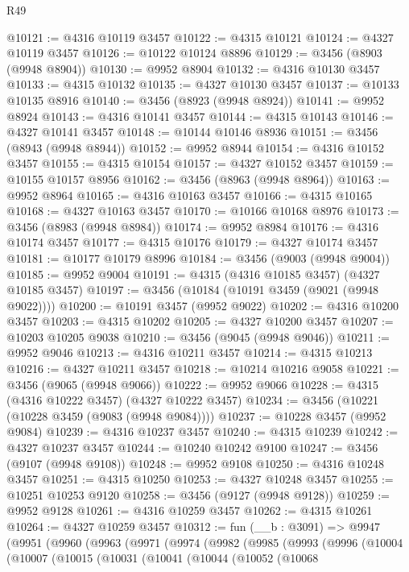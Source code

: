 \begin{lexlean}{R49}
\begin{coremodule}
@10121 := @4316 @10119 @3457
@10122 := @4315 @10121
@10124 := @4327 @10119 @3457
@10126 := @10122 @10124 @8896
@10129 := @3456 (@8903 (@9948 @8904))
@10130 := @9952 @8904
@10132 := @4316 @10130 @3457
@10133 := @4315 @10132
@10135 := @4327 @10130 @3457
@10137 := @10133 @10135 @8916
@10140 := @3456 (@8923 (@9948 @8924))
@10141 := @9952 @8924
@10143 := @4316 @10141 @3457
@10144 := @4315 @10143
@10146 := @4327 @10141 @3457
@10148 := @10144 @10146 @8936
@10151 := @3456 (@8943 (@9948 @8944))
@10152 := @9952 @8944
@10154 := @4316 @10152 @3457
@10155 := @4315 @10154
@10157 := @4327 @10152 @3457
@10159 := @10155 @10157 @8956
@10162 := @3456 (@8963 (@9948 @8964))
@10163 := @9952 @8964
@10165 := @4316 @10163 @3457
@10166 := @4315 @10165
@10168 := @4327 @10163 @3457
@10170 := @10166 @10168 @8976
@10173 := @3456 (@8983 (@9948 @8984))
@10174 := @9952 @8984
@10176 := @4316 @10174 @3457
@10177 := @4315 @10176
@10179 := @4327 @10174 @3457
@10181 := @10177 @10179 @8996
@10184 := @3456 (@9003 (@9948 @9004))
@10185 := @9952 @9004
@10191 := @4315 (@4316 @10185 @3457) (@4327 @10185 @3457)
@10197 := @3456 (@10184 (@10191 @3459 (@9021 (@9948 @9022))))
@10200 := @10191 @3457 (@9952 @9022)
@10202 := @4316 @10200 @3457
@10203 := @4315 @10202
@10205 := @4327 @10200 @3457
@10207 := @10203 @10205 @9038
@10210 := @3456 (@9045 (@9948 @9046))
@10211 := @9952 @9046
@10213 := @4316 @10211 @3457
@10214 := @4315 @10213
@10216 := @4327 @10211 @3457
@10218 := @10214 @10216 @9058
@10221 := @3456 (@9065 (@9948 @9066))
@10222 := @9952 @9066
@10228 := @4315 (@4316 @10222 @3457) (@4327 @10222 @3457)
@10234 := @3456 (@10221 (@10228 @3459 (@9083 (@9948 @9084))))
@10237 := @10228 @3457 (@9952 @9084)
@10239 := @4316 @10237 @3457
@10240 := @4315 @10239
@10242 := @4327 @10237 @3457
@10244 := @10240 @10242 @9100
@10247 := @3456 (@9107 (@9948 @9108))
@10248 := @9952 @9108
@10250 := @4316 @10248 @3457
@10251 := @4315 @10250
@10253 := @4327 @10248 @3457
@10255 := @10251 @10253 @9120
@10258 := @3456 (@9127 (@9948 @9128))
@10259 := @9952 @9128
@10261 := @4316 @10259 @3457
@10262 := @4315 @10261
@10264 := @4327 @10259 @3457
@10312 := fun (__b : @3091) =>
  @9947
    (@9951
      (@9960
        (@9963
          (@9971
            (@9974
              (@9982
                (@9985
                  (@9993
                    (@9996
                      (@10004
                        (@10007
                          (@10015
                            (@10031
                              (@10041
                                (@10044
                                  (@10052
                                    (@10068

\end{coremodule}
\end{lexlean}

